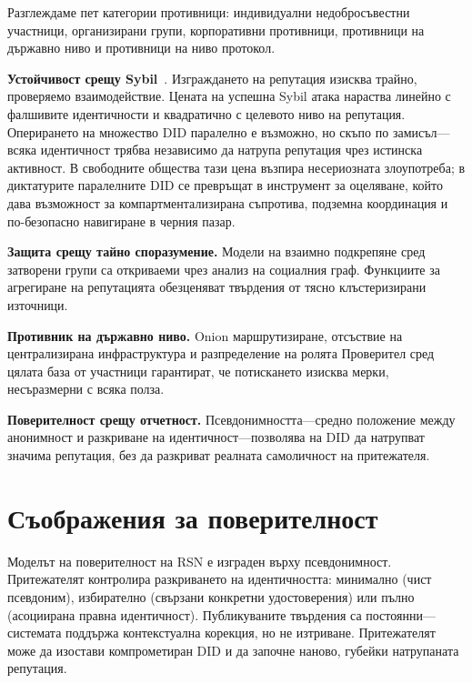\documentclass[11pt,a4paper,twocolumn]{article}
\begin{document}
Разглеждаме пет категории противници: индивидуални недобросъвестни участници, организирани групи, корпоративни противници, противници на държавно ниво и противници на ниво протокол.

\textbf{Устойчивост срещу Sybil}~\cite{douceur2002}. Изграждането на репутация изисква трайно, проверяемо взаимодействие. Цената на успешна Sybil атака нараства линейно с фалшивите идентичности и квадратично с целевото ниво на репутация. Оперирането на множество DID паралелно е възможно, но скъпо по замисъл---всяка идентичност трябва независимо да натрупа репутация чрез истинска активност. В свободните общества тази цена възпира несериозната злоупотреба; в диктатурите паралелните DID се превръщат в инструмент за оцеляване, който дава възможност за компартментализирана съпротива, подземна координация и по-безопасно навигиране в черния пазар.

\textbf{Защита срещу тайно споразумение.} Модели на взаимно подкрепяне сред затворени групи са откриваеми чрез анализ на социалния граф. Функциите за агрегиране на репутацията обезценяват твърдения от тясно клъстеризирани източници.

\textbf{Противник на държавно ниво.} Onion маршрутизиране, отсъствие на централизирана инфраструктура и разпределение на ролята Проверител сред цялата база от участници гарантират, че потискането изисква мерки, несъразмерни с всяка полза.

\textbf{Поверителност срещу отчетност.} Псевдонимността---средно положение между анонимност и разкриване на идентичност---позволява на DID да натрупват значима репутация, без да разкриват реалната самоличност на притежателя.

\section{Съображения за поверителност}

Моделът на поверителност на RSN е изграден върху псевдонимност. Притежателят контролира разкриването на идентичността: минимално (чист псевдоним), избирателно (свързани конкретни удостоверения) или пълно (асоциирана правна идентичност). Публикуваните твърдения са постоянни---системата поддържа контекстуална корекция, но не изтриване. Притежателят може да изостави компрометиран DID и да започне наново, губейки натрупаната репутация.

\end{document}
